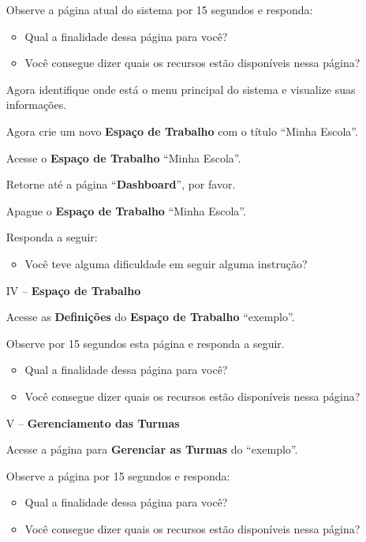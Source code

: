 \begin{apendicesenv}
\begin{enumerate}
Observe a página atual do sistema por 15 segundos e responda:

\begin{itemize}
    \item Qual a finalidade dessa página para você? 
    \item Você consegue dizer quais os recursos estão disponíveis nessa página?
\end{itemize}

Agora identifique onde está o menu principal do sistema e visualize suas informações.

Agora crie um novo \textbf{Espaço de Trabalho} com o título “Minha Escola”.

Acesse o \textbf{Espaço de Trabalho} “Minha Escola”.

Retorne até a página “\textbf{Dashboard}”, por favor.

Apague o \textbf{Espaço de Trabalho} “Minha Escola”. 

Responda a seguir:

\begin{itemize}
    \item Você teve alguma dificuldade em seguir alguma instrução?
\end{itemize}

    \item[IV --] \textbf{Espaço de Trabalho}

Acesse as \textbf{Definições} do \textbf{Espaço de Trabalho} “exemplo”.

Observe por 15 segundos esta página e responda a seguir.

\begin{itemize}
    \item Qual a finalidade dessa página para você? 
    \item Você consegue dizer quais os recursos estão disponíveis nessa página?
\end{itemize}

    \item[V --] \textbf{Gerenciamento das Turmas}
    
Acesse a página para \textbf{Gerenciar as Turmas} do “exemplo”.

Observe a página por 15 segundos e responda:

\begin{itemize}
    \item Qual a finalidade dessa página para você? 
    \item Você consegue dizer quais os recursos estão disponíveis nessa página?
\end{itemize}


\end{enumerate}
\end{apendicesenv}

